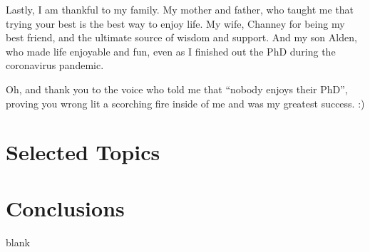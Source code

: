 \documentclass[12pt]{../include/ucthesis}
\begin{document}
\begin{frontmatter}
\begin{acknowledgements}
    Lastly, I am thankful to my family. My mother and father, who taught me that trying your best is the best way to enjoy life. My wife, Channey for being my best friend, and the ultimate source of wisdom and support. And my son Alden, who made life enjoyable and fun, even as I finished out the PhD during the coronavirus pandemic.

    Oh, and thank you to the voice who told me that ``nobody enjoys their PhD'', proving you wrong lit a scorching fire inside of me and was my greatest success. :)
\end{acknowledgements}

\end{frontmatter}

















\chapter{Selected Topics}






\chapter{Conclusions}
blank

\appendix








% 


\nocite{*}
% 

\singlespacing


\doublespacing
\end{document}
